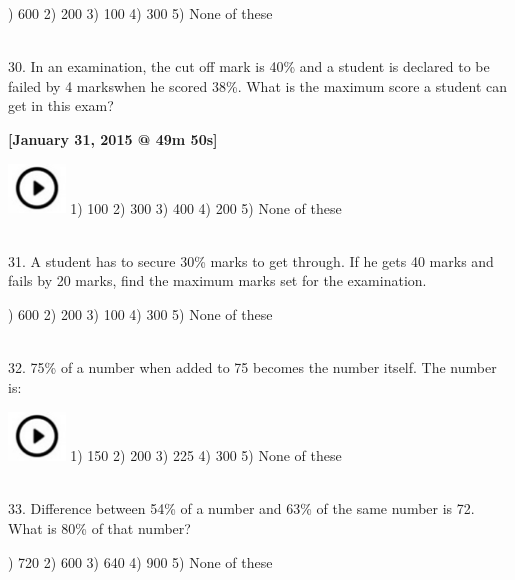 \documentclass{article}
\begin{document}
) 600                      2) 200               3) 100               4) 300               5) None of these

\noindent \\ 30. In an examination, the cut off mark is 40\% and a student is declared to be failed by 4 markswhen he scored 38\%. What is the maximum score a student can get in this exam?

\noindent \textbf{[January 31, 2015 @ 49m 50s]}

\noindent 

\noindent  \includegraphics*[width=0.60in, height=0.52in]{images/image1} 1) 100                      2) 300               3) 400               4) 200               5) None of these

\noindent 

\noindent 

\noindent 

\noindent  \\ 31. A student has to secure 30\% marks to get through. If he gets 40 marks and fails by 20 marks, find the maximum marks set for the examination.

) 600                      2) 200               3) 100               4) 300               5) None of these

\noindent 

\noindent 

\noindent \\ 32. 75\% of a number when added to 75 becomes the number itself. The number is: 

\noindent \includegraphics*[width=0.60in, height=0.52in]{images/image1} 1) 150                      2) 200               3) 225               4) 300               5) None of these

\noindent 

\noindent \\ 33. Difference between 54\% of a number and 63\% of the same number is 72. What is 80\% of that number?

) 720                      2) 600               3) 640               4) 900               5) None of these
\end{document}
